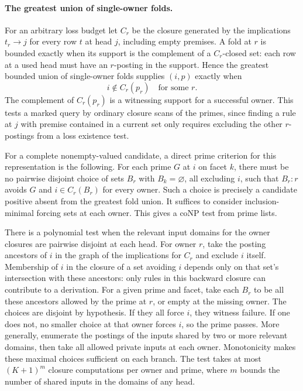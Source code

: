 \paragraph{The greatest union of single-owner folds.}
For an arbitrary loss budget let $C_r$ be the closure
generated by the implications $t_r\to j$ for every
row $t$ at head $j$, including empty premises. A fold
at $r$ is bounded exactly when its support is the
complement of a $C_r$-closed set: each row at a used
head must have an $r$-posting in the support. Hence the
greatest bounded union of single-owner folds supplies
$(i,p)$ exactly when
\[
                   i\notin C_r(p_r)\quad\text{for some }r.
\]
The complement of $C_r(p_r)$ is a witnessing support
for a successful owner. This tests a marked query by
ordinary closure scans of the primes, since finding a
rule at $j$ with premise contained in a current set only
requires excluding the other $r$-postings from a loss
existence test.

For a complete nonempty-valued candidate, a direct
prime criterion for this representation is the following.
For each prime $G$ at $i$ on facet $k$, there must be no
pairwise disjoint choice of sets $B_r$ with
$B_k=\varnothing$, all excluding $i$, such that
$B_r:r$ avoids $G$ and $i\in C_r(B_r)$ for every owner.
Such a choice is precisely a candidate positive absent
from the greatest fold union. It suffices to consider
inclusion-minimal forcing sets at each owner. This gives
a coNP test from prime lists.

There is a polynomial test when the relevant input
domains for the owner closures are pairwise disjoint at
each head. For owner $r$, take the posting ancestors of
$i$ in the graph of the implications for $C_r$ and exclude
$i$ itself. Membership of $i$ in the closure of a set
avoiding $i$ depends only on that set's intersection with
these ancestors: only rules in this backward closure can
contribute to a derivation. For a given prime and facet,
take each $B_r$ to be all these ancestors allowed by the
prime at $r$, or empty at the missing owner. The choices
are disjoint by hypothesis. If they all force $i$, they
witness failure. If one does not, no smaller choice at
that owner forces $i$, so the prime passes.
More generally, enumerate the postings of the inputs
shared by two or more relevant domains, then take all
allowed private inputs at each owner. Monotonicity makes
these maximal choices sufficient on each branch. The
test takes at most $(K+1)^m$ closure computations per
owner and prime, where $m$ bounds the number of shared
inputs in the domains of any head.


